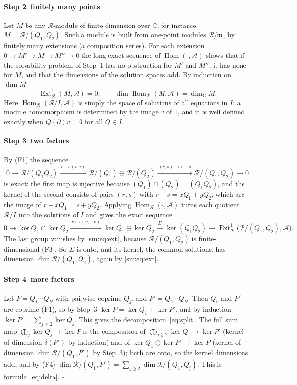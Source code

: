 \documentclass[11pt]{article}
\theoremstyle{plain}
\theoremstyle{definition}
\theoremstyle{remark}
\newcommand{\C}{\mathbb{C}}
\newcommand{\ring}{\mathcal{R}}            %
\begin{document}
\paragraph{Step 2: finitely many points} Let $M$ be any $\ring$-module of finite dimension over $\C$, for instance
$M=\ring/(Q_1,Q_2)$. Such a module is built from one-point modules $\ring/\mathfrak m_z$ by finitely many extensions
(a composition series). For each extension $0\to M'\to M\to M''\to0$ the long exact sequence of
$\operatorname{Hom}(\cdot,\mathcal A)$ shows that if the solvability problem of Step~1 has no obstruction for $M'$ and
$M''$, it has none for $M$, and that the dimensions of the solution spaces add. By induction on $\dim M$,
\begin{equation}\label{sm:eq:ext}
  \operatorname{Ext}^1_\ring(M,\mathcal A)=0,\qquad \dim\operatorname{Hom}_\ring(M,\mathcal A)=\dim_\C M .
\end{equation}
Here $\operatorname{Hom}_\ring(\ring/I,\mathcal A)$ is simply the space of solutions of all equations in $I$: a module
homomorphism is determined by the image $v$ of $1$, and it is well defined exactly when $Q(\partial)v=0$ for all $Q\in I$.

\paragraph{Step 3: two factors} By (F1) the sequence
\[
  0\to\ring/(Q_1Q_2)\xrightarrow{\ r\mapsto(r,r)\ }\ring/(Q_1)\oplus\ring/(Q_2)\xrightarrow{\ (r,s)\mapsto r-s\ }\ring/(Q_1,Q_2)\to0
\]
is exact: the first map is injective because $(Q_1)\cap(Q_2)=(Q_1Q_2)$, and the kernel of the second consists of pairs
$(r,s)$ with $r-s=xQ_1+yQ_2$, which are the image of $r-xQ_1=s+yQ_2$. Applying $\operatorname{Hom}_\ring(\cdot,\mathcal A)$
turns each quotient $\ring/I$ into the solutions of $I$ and gives the exact sequence
\[
  0\to\ker Q_1\cap\ker Q_2\xrightarrow{\ v\mapsto(v,-v)\ }\ker Q_1\oplus\ker Q_2\xrightarrow{\ \Sigma\ }\ker(Q_1Q_2)\to
  \operatorname{Ext}^1_\ring\big(\ring/(Q_1,Q_2),\mathcal A\big).
\]
The last group vanishes by \eqref{sm:eq:ext}, because $\ring/(Q_1,Q_2)$ is finite-dimensional (F3). So $\Sigma$ is onto,
and its kernel, the common solutions, has dimension $\dim\ring/(Q_1,Q_2)$, again by \eqref{sm:eq:ext}.

\paragraph{Step 4: more factors} Let $P=Q_1\cdots Q_N$ with pairwise coprime $Q_j$, and $P'=Q_2\cdots Q_N$. Then $Q_1$ and
$P'$ are coprime (F1), so by Step~3 $\ker P=\ker Q_1+\ker P'$, and by induction $\ker P'=\sum_{j\ge2}\ker Q_j$. This gives
the decomposition~\eqref{eq:split}. The full sum map $\bigoplus_j\ker Q_j\to\ker P$ is the composition of
$\bigoplus_{j\ge2}\ker Q_j\to\ker P'$ (kernel of dimension $\delta(P')$ by induction) and of
$\ker Q_1\oplus\ker P'\to\ker P$ (kernel of dimension $\dim\ring/(Q_1,P')$ by Step~3); both are onto, so the kernel
dimensions add, and by (F4) $\dim\ring/(Q_1,P')=\sum_{j\ge2}\dim\ring/(Q_1,Q_j)$. This is formula~\eqref{eq:delta}.
\hfill$\square$
\end{document}
